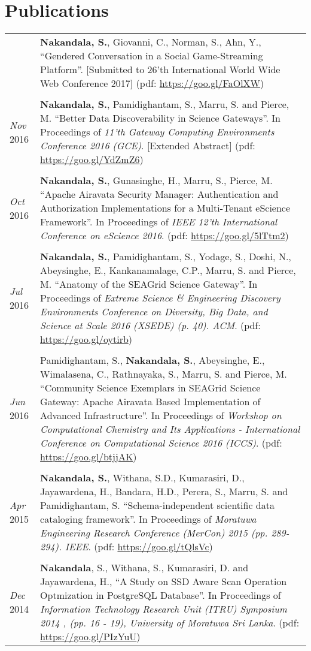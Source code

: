 \documentclass[a4paper,10pt]{article}
\begin{document}
\section{Publications}

\begin{tabular}{p{3cm}|p{13.5cm}}

& \textbf{Nakandala, S.}, Giovanni, C., Norman, S., Ahn, Y., ``Gendered Conversation in a Social Game-Streaming Platform''. [Submitted to 26'th International World Wide Web Conference 2017] (pdf: \url{https://goo.gl/FaOlXW})
\\\\
\emph{Nov} 2016 & \textbf{Nakandala, S.}, Pamidighantam, S., Marru, S. and Pierce, M. ``Better Data Discoverability in Science Gateways''. In Proceedings of \textit{11'th Gateway Computing Environments Conference 2016 (GCE)}. [Extended Abstract] (pdf: \url{https://goo.gl/YdZmZ6})
\\\\
\emph{Oct} 2016 & \textbf{Nakandala, S.}, Gunasinghe, H., Marru, S., Pierce, M. ``Apache Airavata Security Manager: Authentication and Authorization Implementations for a Multi-Tenant eScience Framework''. In Proceedings of \textit{IEEE 12'th International Conference on eScience 2016}. (pdf: \url{https://goo.gl/5lTtm2})
\\\\
\emph{Jul} 2016 & \textbf{Nakandala, S.}, Pamidighantam, S., Yodage, S., Doshi, N., Abeysinghe, E., Kankanamalage, C.P., Marru, S. and Pierce, M. ``Anatomy of the SEAGrid Science Gateway''. In Proceedings of \textit{Extreme Science \& Engineering Discovery Environments Conference on Diversity, Big Data, and Science at Scale 2016 (XSEDE) (p. 40). ACM}. (pdf: \url{https://goo.gl/oytirb})
\\\\
\emph{Jun} 2016 & Pamidighantam, S., \textbf{Nakandala, S.}, Abeysinghe, E., Wimalasena, C., Rathnayaka, S., Marru, S. and Pierce, M. ``Community Science Exemplars in SEAGrid Science Gateway: Apache Airavata Based Implementation of Advanced Infrastructure''. In Proceedings of \textit{Workshop on Computational Chemistry and Its Applications - International Conference on Computational Science 2016 (ICCS)}. (pdf: \url{https://goo.gl/btjjAK})
\\\\
\emph{Apr} 2015 & \textbf{Nakandala, S.}, Withana, S.D., Kumarasiri, D., Jayawardena, H., Bandara, H.D., Perera, S., Marru, S. and Pamidighantam, S. ``Schema-independent scientific data cataloging framework''. In Proceedings of \textit{Moratuwa Engineering Research Conference (MerCon) 2015 (pp. 289-294). IEEE}. (pdf: \url{https://goo.gl/tQlsVc})
\\\\
\emph{Dec} 2014 & \textbf{Nakandala}, S., Withana, S., Kumarasiri, D. and Jayawardena, H., ``A Study on SSD Aware Scan Operation Optmization in PostgreSQL Database''. In Proceedings of \textit{Information Technology Research Unit (ITRU) Symposium 2014 , (pp. 16 - 19), University of Moratuwa Sri Lanka}. (pdf: \url{https://goo.gl/PIzYuU})
\end{tabular}
\end{document}
